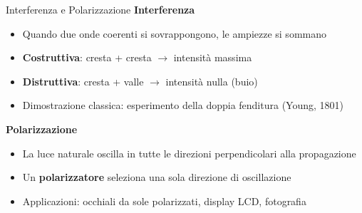 \begin{frame}{Interferenza e Polarizzazione}
    \textbf{Interferenza}
    \begin{itemize}
        \item Quando due onde coerenti si sovrappongono, le ampiezze si sommano
        \item \textbf{Costruttiva}: cresta + cresta $\rightarrow$ intensità massima
        \item \textbf{Distruttiva}: cresta + valle $\rightarrow$ intensità nulla (buio)
        \item Dimostrazione classica: esperimento della doppia fenditura (Young, 1801)
    \end{itemize}
    \vspace{0.3cm}
    \textbf{Polarizzazione}
    \begin{itemize}
        \item La luce naturale oscilla in tutte le direzioni perpendicolari alla propagazione
        \item Un \textbf{polarizzatore} seleziona una sola direzione di oscillazione
        \item Applicazioni: occhiali da sole polarizzati, display LCD, fotografia
    \end{itemize}
\end{frame}